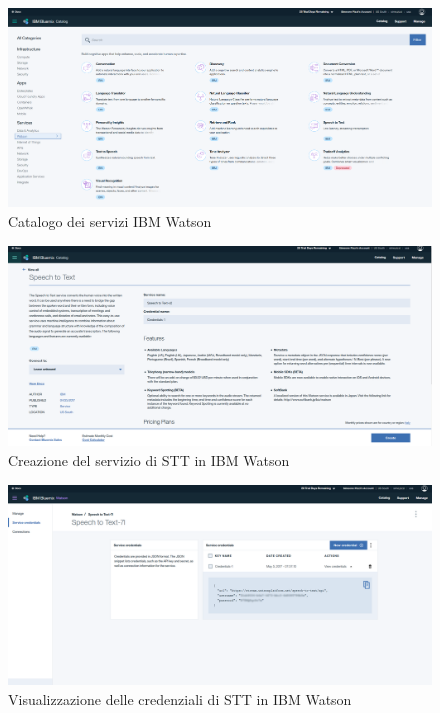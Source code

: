 \begin{figure}[h]
	\centerline{\includegraphics[width=1\textwidth,height=\textheight,keepaspectratio]{sezioni/images/watson.PNG}}
	\caption{Catalogo dei servizi IBM Watson}\label{fig:consoleWatson}
\end{figure}
\begin{figure}[h]
	\centerline{\includegraphics[width=1\textwidth,height=\textheight,keepaspectratio]{sezioni/images/watson-create.PNG}}
	\caption{Creazione del servizio di STT in IBM Watson}\label{fig:serviceWatson}
\end{figure}
\begin{figure}[h]
	\centerline{\includegraphics[width=1\textwidth,height=\textheight,keepaspectratio]{sezioni/images/watson-credentials.PNG}}
	\caption{Visualizzazione delle credenziali di STT in IBM Watson}\label{fig:credentialsWatson}
\end{figure}
\newpage
